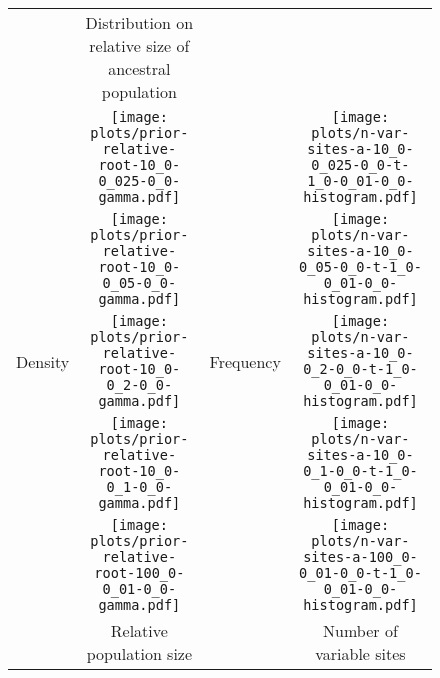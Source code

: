 \documentclass[border=10pt,varwidth=30cm]{standalone}
\begin{document}
\begin{figure}
    \centering
    \begin{tabular}{@{}cccc@{}}
        & \multirow{1}{0.15\textwidth}{\centering\Large Distribution on relative size of ancestral population}
        &
        & \\[9ex]%
        \multirow{5}{*}[-14em]{\begin{sideways}\large Density\end{sideways}}
        & \texttt{[image: plots/prior-relative-root-10\_0-0\_025-0\_0-gamma.pdf]}
        & \multirow{5}{*}[-14em]{\begin{sideways}\large Frequency\end{sideways}}
        & \texttt{[image: plots/n-var-sites-a-10\_0-0\_025-0\_0-t-1\_0-0\_01-0\_0-histogram.pdf]} \\
        & \texttt{[image: plots/prior-relative-root-10\_0-0\_05-0\_0-gamma.pdf]}
        &
        & \texttt{[image: plots/n-var-sites-a-10\_0-0\_05-0\_0-t-1\_0-0\_01-0\_0-histogram.pdf]} \\
        & \texttt{[image: plots/prior-relative-root-10\_0-0\_2-0\_0-gamma.pdf]}
        &
        & \texttt{[image: plots/n-var-sites-a-10\_0-0\_2-0\_0-t-1\_0-0\_01-0\_0-histogram.pdf]} \\
        & \texttt{[image: plots/prior-relative-root-10\_0-0\_1-0\_0-gamma.pdf]}
        &
        & \texttt{[image: plots/n-var-sites-a-10\_0-0\_1-0\_0-t-1\_0-0\_01-0\_0-histogram.pdf]} \\
        & \texttt{[image: plots/prior-relative-root-100\_0-0\_01-0\_0-gamma.pdf]}
        &
        & \texttt{[image: plots/n-var-sites-a-100\_0-0\_01-0\_0-t-1\_0-0\_01-0\_0-histogram.pdf]} \\
        & \multirow{1}{0.15\textwidth}{\centering\large Relative population size}
        &
        & \multicolumn{1}{c}{Number of variable sites} \\
    \end{tabular}
\end{figure}
\end{document}
